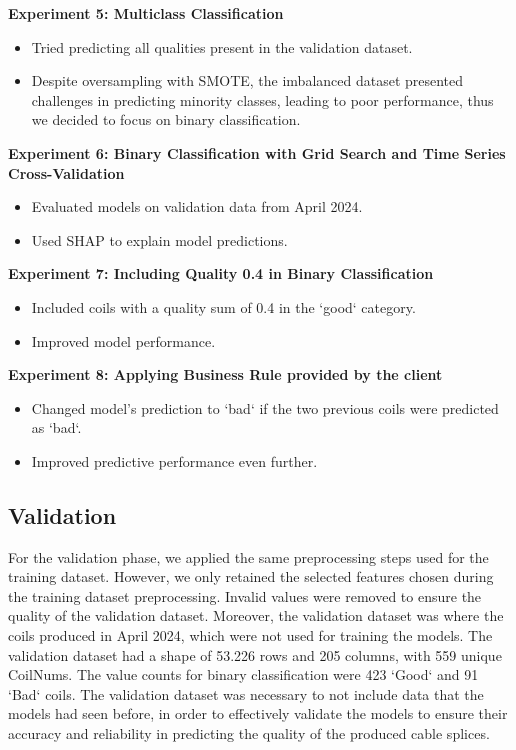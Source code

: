 \textbf{Experiment 5: Multiclass Classification}
\begin{itemize}
    \item Tried predicting all qualities present in the validation dataset.
    \item Despite oversampling with SMOTE, the imbalanced dataset presented challenges in
          predicting minority classes, leading to poor performance, thus we decided to
          focus on binary classification.
\end{itemize}

\textbf{Experiment 6: Binary Classification with Grid Search and Time Series Cross-Validation}
\begin{itemize}
    \item Evaluated models on validation data from April 2024.
    \item Used SHAP to explain model predictions.
\end{itemize}

\textbf{Experiment 7: Including Quality 0.4 in Binary Classification}
\begin{itemize}
    \item Included coils with a quality sum of 0.4 in the `good` category.
    \item Improved model performance.
\end{itemize}

\textbf{Experiment 8: Applying Business Rule provided by the client}
\begin{itemize}
    \item Changed model's prediction to `bad` if the two previous coils were predicted as
          `bad`.
    \item Improved predictive performance even further.
\end{itemize}

\subsection{Validation}

For the validation phase, we applied the same preprocessing steps used for the
training dataset. However, we only retained the selected features chosen during
the training dataset preprocessing. Invalid values were removed to ensure the
quality of the validation dataset. Moreover, the validation dataset was where
the coils produced in April 2024, which were not used for training the models.
The validation dataset had a shape of 53.226 rows and 205 columns, with 559
unique CoilNums. The value counts for binary classification were 423 `Good` and
91 `Bad` coils. The validation dataset was necessary to not include data that
the models had seen before, in order to effectively validate the models to
ensure their accuracy and reliability in predicting the quality of the produced
cable splices.

